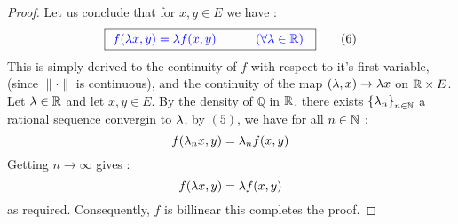 \begin{proof}
Let us conclude that for $x,y \in  E$ we have : 
\[
  \fbox{
    \textcolor{blue}{
    $ 
f(\lambda x, y) = \lambda f(x,y)  
  \quad \quad \quad \left( \forall \lambda \in  \mathbb{R} \right)
    $ 
    }
  } \quad \quad  (6) 
\]
This is simply derived to the continuity of $f $ with respect to it's first variable, 
(since $\| \cdot  \|  $ is continuous), and the continuity of the map
$(\lambda,x) \rightarrow \lambda x  $ on $\mathbb{R}  \times E  $. Let $\lambda \in  \mathbb{R}  $ and 
let $x,y \in  E $. By the density of $\mathbb{Q} $ in $\mathbb{R}  $, there exists 
$\left\{ \lambda_{n} \right\}_{n \in  \mathbb{N}} $  a rational sequence convergin to $\lambda $, 
by $(5)$, we have for all $n \in  \mathbb{N} $ :
\[
f (\lambda _{n} x, y )  = \lambda_n f(x,y) 
\]
Getting $n \rightarrow  \infty $ gives : 
\[
f(\lambda x, y)  = 
\lambda f(x,y) 
\]
as required. Consequently, $f $ is billinear 
this completes the proof.
\end{proof}
% 
